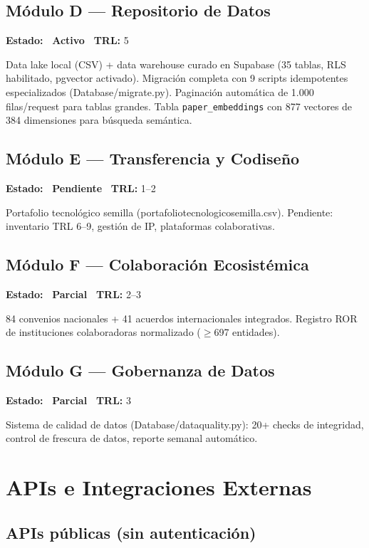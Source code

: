 \documentclass[12pt,a4paper]{report}
\newcommand{\filebreak}{\char95\allowbreak}
\newcommand{\file}[1]{{\color{cchenblue}\ttfamily\let\_\filebreak #1}}
\newcommand{\badge}[2]{%
  \colorbox{#1}{\color{white}\small\textbf{\ #2\ }}%
}
\newcommand{\bpending}{\badge{kpigold}{Pendiente}}
\newcommand{\bactive}{\badge{cchengreen}{Activo}}
\newcommand{\bpartial}{\badge{cchengold}{Parcial}}
\begin{document}
\section{Módulo D --- Repositorio de Datos}
\textbf{Estado:} \bactive \quad \textbf{TRL:} 5

Data lake local (CSV) + data warehouse curado en Supabase (35 tablas, RLS habilitado, pgvector activado). Migración completa con 9 scripts idempotentes especializados (\file{Database/migrate\_*.py}). Paginación automática de 1.000 filas/request para tablas grandes. Tabla \texttt{paper\_embeddings} con 877 vectores de 384 dimensiones para búsqueda semántica.

\section{Módulo E --- Transferencia y Codiseño}
\textbf{Estado:} \bpending \quad \textbf{TRL:} 1--2

Portafolio tecnológico semilla (\file{portafolio\_tecnologico\_semilla.csv}). Pendiente: inventario TRL 6--9, gestión de IP, plataformas colaborativas.

\section{Módulo F --- Colaboración Ecosistémica}
\textbf{Estado:} \bpartial \quad \textbf{TRL:} 2--3

84 convenios nacionales + 41 acuerdos internacionales integrados. Registro ROR de instituciones colaboradoras normalizado ($\geq$697 entidades).

\section{Módulo G --- Gobernanza de Datos}
\textbf{Estado:} \bpartial \quad \textbf{TRL:} 3

Sistema de calidad de datos (\file{Database/data\_quality.py}): 20+ checks de integridad, control de frescura de datos, reporte semanal automático.

\chapter{APIs e Integraciones Externas}

\section{APIs públicas (sin autenticación)}
\end{document}

